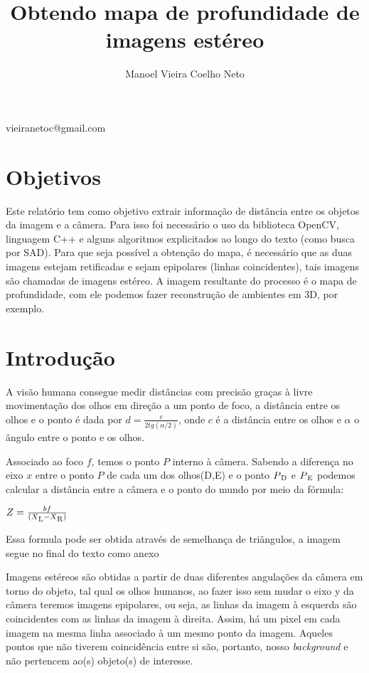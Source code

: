 \documentclass[conference,harvard,brazil,english]{sbatex}
\begin{document}
	\title{Obtendo mapa de profundidade de imagens estéreo}
	\author{Manoel Vieira Coelho Neto}{vieiranetoc@gmail.com}
	\address{SQS 203 Bloco J\\ Brasília, DF, Brasil}
	
	\twocolumn[{
		\maketitle		
	}]
	\section{Objetivos}
		\par Este relatório tem como objetivo extrair informação de distância entre os objetos da imagem e a câmera. Para isso foi necessário o uso da biblioteca OpenCV, linguagem C++ e alguns algoritmos explicitados ao longo do texto (como busca por SAD). Para que seja possível a obtenção do mapa, é necessário que as duas imagens estejam retificadas e sejam epipolares (linhas coincidentes), tais imagens são chamadas de imagens estéreo. A imagem resultante do processo é o mapa de profundidade, com ele podemos fazer reconstrução de ambientes em 3D, por exemplo.
	\section{Introdução}
		\par A visão humana consegue medir distâncias com precisão graças à livre movimentação dos olhos em direção a um ponto de foco, a distância entre os olhos e o ponto é dada por $ d = \frac{c}{2tg(\alpha/2)}$, onde $c$ é a distância entre os olhos e $\alpha$ o ângulo entre o ponto e os olhos.	
		\par Associado ao foco $f$, temos o ponto $P$ interno à câmera. Sabendo a diferença no eixo $x$ entre o ponto $P$ de cada um dos olhos(D,E) e o ponto $P\textsubscript{D}$ e $P\textsubscript{E}$ podemos calcular a distância entre a câmera e o ponto do mundo por meio da fórmula:\newline 
		\par $Z= \frac{bf}{(X\textsubscript{L} - X\textsubscript{R})}$
		\par {  \tiny  Essa formula pode ser obtida através de semelhança de triângulos, a imagem segue no final do texto como anexo}	
		\par Imagens estéreos são obtidas a partir de duas diferentes angulações da câmera em torno do objeto, tal qual os olhos humanos, ao fazer isso sem mudar o eixo y da câmera teremos imagens epipolares, ou seja, as linhas da imagem à esquerda são coincidentes com as linhas da imagem à direita. Assim, há um pixel em cada imagem na mesma linha associado à um mesmo ponto da imagem. Aqueles pontos que não tiverem coincidência entre si são, portanto, nosso \textit{background} e não pertencem ao(s) objeto(s) de interesse.
	
\end{document}
